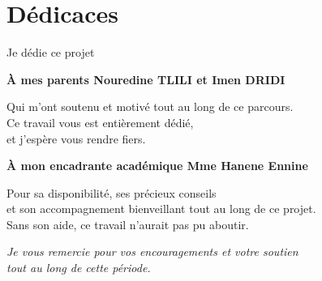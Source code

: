 \chapter*{Dédicaces}

\vspace{3cm}

\begin{center}

Je dédie ce projet

\vspace{1.5cm}

\textbf{À mes parents Nouredine TLILI et Imen DRIDI}

\vspace{0.5cm}

Qui m'ont soutenu et motivé tout au long de ce parcours.\\
Ce travail vous est entièrement dédié,\\
et j'espère vous rendre fiers.

\vspace{1.5cm}

\textbf{À mon encadrante académique Mme Hanene Ennine}

\vspace{0.5cm}

Pour sa disponibilité, ses précieux conseils\\
et son accompagnement bienveillant tout au long de ce projet.\\
Sans son aide, ce travail n'aurait pas pu aboutir.

\vspace{1.5cm}

\textit{Je vous remercie pour vos encouragements et votre soutien\\
tout au long de cette période.}

\end{center}